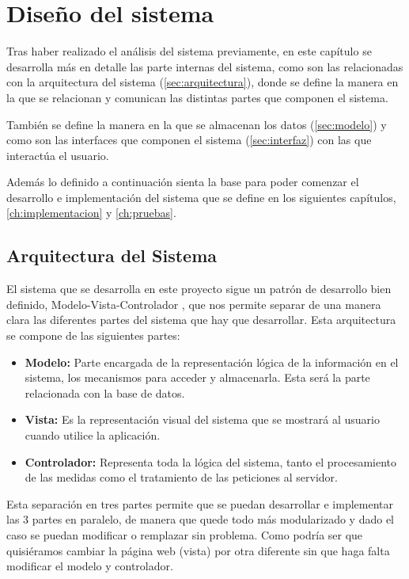 \chapter{Diseño del sistema}
\label{ch:diseno}
Tras haber realizado el análisis del sistema previamente, en este capítulo se desarrolla más en detalle las parte internas del sistema, como son las relacionadas con la arquitectura del sistema (\autoref{sec:arquitectura}), donde se define la manera en la que se relacionan y comunican las distintas partes que componen el sistema. 

También se define la manera en la que se almacenan los datos (\autoref{sec:modelo}) y como son las interfaces que componen el sistema (\autoref{sec:interfaz}) con las que interactúa el usuario. 

Además lo definido a continuación sienta la base para poder comenzar el desarrollo e implementación del sistema que se define en los siguientes capítulos, \autoref{ch:implementacion} y \autoref{ch:pruebas}.

\section{Arquitectura del Sistema}\label{sec:arquitectura}
El sistema que se desarrolla en este proyecto sigue un patrón de desarrollo bien definido, Modelo-Vista-Controlador \cite{bucanek_model-view-controller_2009}, que nos permite separar de una manera clara las diferentes partes del sistema que hay que desarrollar. Esta arquitectura se compone de las siguientes partes:
\begin{itemize}
	\item \textbf{Modelo:} Parte encargada de la representación lógica de la información en el sistema, los mecanismos para acceder y almacenarla. Esta será la parte relacionada con la base de datos.
	\item \textbf{Vista:} Es la representación visual del sistema que se mostrará al usuario cuando utilice la aplicación.
	\item \textbf{Controlador:} Representa toda la lógica del sistema, tanto el procesamiento de las medidas como el tratamiento de las peticiones al servidor.
\end{itemize}

Esta separación en tres partes permite que se puedan desarrollar e implementar las 3 partes en paralelo, de manera que quede todo más modularizado y dado el caso se puedan modificar o remplazar sin problema. Como podría ser que quisiéramos cambiar la página web (vista) por otra diferente sin que haga falta modificar el modelo y controlador. 

